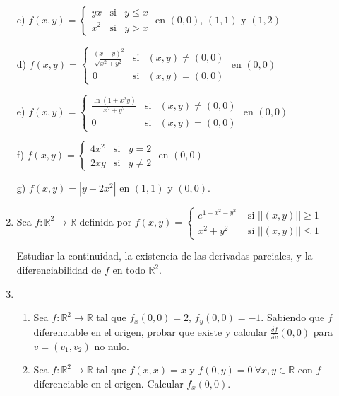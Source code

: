 \documentclass[11pt]{article}
\newcommand{\R}{\mathbb{R}}
\begin{document}
\begin{enumerate}
c) $f(x,y)=\left\{ 
\begin{array}{ccc}
yx & \text{si} & y\leq x \\ 
x^{2} & \text{si} & y>x%
\end{array}%
\right. $ en $\left( 0,0\right) $, $\left( 1,1\right) $ y $\left( 1,2\right) 
$ 

d) $f(x,y)=\left\{ 
\begin{array}{ccc}
\frac{(x-y)^{2}}{\sqrt{x^{2}+y^{2}}} & \text{si} & \left( x,y\right) \neq
\left( 0,0\right)  \\ 
0 & \text{si} & \left( x,y\right) =\left( 0,0\right) 
\end{array}%
\right. $ en $\left( 0,0\right) $  

e) $f(x,y)=\left\{ 
\begin{array}{ccc}
\frac{\ln \left( 1+x^{2}y\right) }{x^{2}+y^{2}} & \text{si} & \left(
x,y\right) \neq \left( 0,0\right)  \\ 
0 & \text{si} & \left( x,y\right) =\left( 0,0\right) 
\end{array}%
\right. $ en $\left( 0,0\right) $ 

f) $f(x,y)=\left\{ 
\begin{array}{ccc}
4x^{2} & \text{si} & y=2 \\ 
2xy & \text{si} & y\neq 2%
\end{array}%
\right. $ en $\left( 0,0\right) $ 

g) $f(x,y)=|y-2x^{2}|$ en $(1,1)$ y $(0,0)$.

\item Sea $f:\R^2\to \R$ definida por 
      $f(x,y)= \begin{cases}
          e^{1- x^2 - y^2} &\text{ si }||(x,y)||\geq 1\\  
          x^2 + y^2 &\text{ si }||(x,y)|| \leq 1 \end{cases}$
            
      Estudiar la continuidad, la existencia de las derivadas
      parciales, y la diferenciabilidad de $f$ en todo $\R^2$.  

\item\begin{enumerate}

\item Sea $f:\R^2 \to \R$ tal que $f_x(0,0) = 2$,
          $f_y(0,0)=-1$. Sabiendo que $f$ diferenciable en el origen,
          probar que existe y calcular $\frac{\delta f}{\delta v}
          (0,0)$ para $v=(v_1,v_2)$ no nulo. 
        \item Sea $f:\R^2 \to \R$ tal que $f(x,x)=x$ y $f(0,y)=0\
          \forall x,y\in \R$ con $f$ diferenciable en el
          origen. Calcular $f_x(0,0)$.  
    \end{enumerate}         
        
\end{enumerate}
\end{document}
